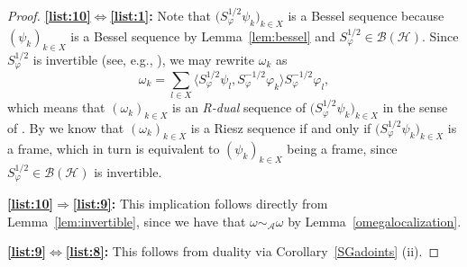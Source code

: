 \documentclass{amsart}
\def\Hil{\mathcal{H}}
\newcommand{\B}[0]{{\mathcal{B}}}
\newcommand{\A}[0]{{\mathcal{A}}}
\begin{document}
\begin{proof}
\textbf{\ref{list:10}$\Leftrightarrow$\ref{list:1}:} Note that $\big(S_\varphi^{1/2}\psi_k\big)_{k\in X}$ is a Bessel sequence because $(\psi_k)_{k\in X}$ is a Bessel sequence by Lemma~\ref{lem:bessel} and $S_\varphi^{1/2}\in \B(\Hil)$. Since $S_\varphi^{1/2}$ is invertible (see, e.g., \cite{ole1n}), we may rewrite $\omega_k$ as
$$\omega_k=\sum_{l\in X}\langle S_\varphi^{1/2}\psi_l,S_\varphi^{-1/2}\varphi_k\rangle S_\varphi^{-1/2}\varphi_l,$$
which means that $(\omega_k)_{k\in X}$ is an \emph{R-dual} sequence of $\big(S_\varphi^{1/2}\psi_k\big)_{k\in X}$ in the sense of \cite{Casazza2004}. By \cite[Theorem~2]{Casazza2004} we know that $(\omega_k)_{k\in X}$ is a Riesz sequence if and only if $\big(S_\varphi^{1/2}\psi_k\big)_{k\in X}$ is a frame, which in turn is equivalent to $(\psi_k)_{k\in X}$ being a frame, since $S_\varphi^{1/2}\in \B(\Hil)$ is invertible.\medskip

\textbf{\ref{list:10}$\Rightarrow$\ref{list:9}:} This implication follows directly from Lemma~\ref{lem:invertible}, since we have that $\omega\sim_\A \omega$ by Lemma~\ref{omegalocalization}. %
\medskip

\textbf{\ref{list:9}$ {\Leftrightarrow}$\ref{list:8}:} This follows from duality via Corollary~\ref{SGadoints} (ii).\medskip


\end{proof}
\end{document}
